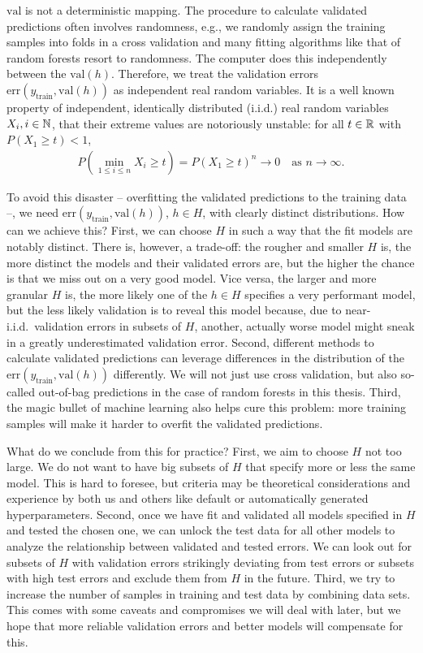 $\text{val}$ is not a deterministic mapping. The procedure to calculate validated predictions often 
involves randomness, e.g., we randomly assign the training samples into folds in a cross validation 
and many fitting algorithms like that of random forests resort to randomness. The computer does this 
independently between the $\text{val}(h)$. Therefore, we treat the validation errors
$\text{err}(y_\text{train}, \text{val}(h))$ as independent 
real random variables. It is a well known property of independent, identically distributed (i.i.d.) 
real random variables $X_i, i \in \mathbb{N}$, that their extreme values are notoriously unstable: for all 
$t \in \mathbb{R}$ with $P(X_1 \geq t) < 1$, 
\begin{align}
    P\left( \min_{1 \leq i \leq n} X_i \geq t \right) = P(X_1 \geq t)^n \to 0 \quad
    \text{as } n \to \infty.
\end{align}

To avoid this disaster -- overfitting the validated predictions to the training 
data --, we need $\text{err}(y_\text{train}, \text{val}(h))$, $h \in H$, with clearly distinct 
distributions. 
How can we achieve this? First, we can choose $H$ in such a way that the fit models are 
notably distinct. There is, however, a trade-off: the rougher and smaller $H$ is, the more distinct 
the models and their validated errors are, but the higher the chance is that we miss out on a very good 
model. Vice versa, the larger and more granular $H$ is, the more likely one of the $h \in H$ 
specifies a very performant model, but the less likely validation is to reveal this model because,
due to near-i.i.d.\ validation errors in subsets of $H$, another, actually worse model might sneak 
in a greatly underestimated validation error. Second, different methods to calculate validated
predictions can leverage differences in the distribution of the 
$\text{err}(y_\text{train}, \text{val}(h))$ differently. We will not just use cross validation, but 
also so-called out-of-bag predictions in the case of random forests in this thesis. Third, the 
magic bullet of machine learning also helps cure this problem: more training samples will make it 
harder to overfit the validated predictions.

What do we conclude from this for practice? First, we aim to choose $H$ not too large.
We do not want to have big subsets of $H$ that specify more or less the same model. This is hard 
to foresee, but criteria may be theoretical considerations and experience by both us and others 
like default or automatically generated hyperparameters. Second, once we have fit and validated 
all models specified in $H$ and tested the chosen one, we can unlock the test data for all other 
models to analyze the relationship between validated and tested errors. We can look out for subsets 
of $H$ with validation errors strikingly deviating from test errors or subsets with high test errors and 
exclude them from $H$ in the future. Third, we try to increase the number of samples in training 
and test data by combining data sets. This comes with some caveats and compromises we will deal with 
later, but we hope that more reliable validation errors and better models will compensate for this.

